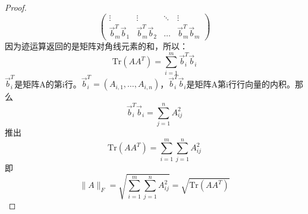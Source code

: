 \begin{proof}
\begin{equation}
\begin{pmatrix}
			\vdots&\vdots&\ddots&\vdots\\
			\overrightarrow{b}_m^T\overrightarrow{b}_1&\overrightarrow{b}_m^T\overrightarrow{b}_2&
			\dots&
			\overrightarrow{b}_m^T\overrightarrow{b}_m			
		\end{pmatrix}
	\end{equation}
	因为迹运算返回的是矩阵对角线元素的和，所以：
	\begin{equation}
		\mathrm{Tr}(AA^T)=\sum_{i=1}^{m}\overrightarrow{b}_i^T\overrightarrow{b}_i
	\end{equation}
	$\overrightarrow{b}_i^T$是矩阵A的第i行。$\overrightarrow{b}_i^T=(A_{i,1},\dots,A_{i,n})$，$\overrightarrow{b}_i^T\overrightarrow{b}_i$是矩阵A第i行行向量的内积。那么
	\begin{equation}
		\overrightarrow{b}_i^T\overrightarrow{b}_i=\sum_{j=1}^{n}A_{ij}^2
	\end{equation}
	推出
	\begin{equation}
		\mathrm{Tr}(AA^T)=\sum_{i=1}^{m}\sum_{j=1}^{n}A_{ij}^2
	\end{equation}
	即
	\begin{equation}
		\lVert A \rVert_F=\sqrt{\sum_{i=1}^{m}\sum_{j=1}^{n}A_{ij}^2}=\sqrt{\mathrm{Tr}(AA^T)}
	\end{equation}
\end{proof}

